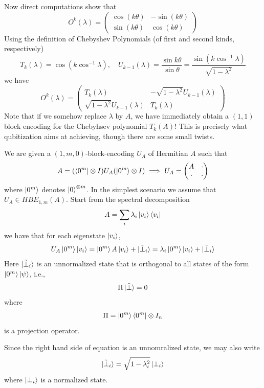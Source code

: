\documentclass[12pt, oneside]{book}
\theoremstyle{definition}
\theoremstyle{definition}
\theoremstyle{remark}
\begin{document}
Now direct computations show that
\[
O^k(\lambda)=\begin{pmatrix} \cos (k\theta) & -\sin (k \theta) \\ \sin (k\theta) & \cos (k\theta) \end{pmatrix}
\]
Using the definition of Chebyshev Polynomials (of first and second kinds, respectively)
\[
T_k(\lambda)=\cos{(k \cos^{-1}\lambda)}, \quad  U_{k-1}(\lambda) =\frac{\sin{k\theta}}{\sin{\theta}} =\frac{\sin(k\cos^{-1}\lambda)}{\sqrt{1-\lambda^2}}
\]
we have
\[
O^k(\lambda) = \begin{pmatrix} T_k(\lambda) & - \sqrt{1-\lambda^2}U_{k-1}(\lambda)\\
\sqrt{1-\lambda^2} U_{k-1}(\lambda) & T_k(\lambda) \end{pmatrix}
\]
Note that if we somehow replace $\lambda$ by $A$, we have immediately obtain a $(1,1)$ block encoding for the Chebyhsev polynomial $T_k(A)$! This is precisely what qubitization aims at achieving, though there are some small twists.

We are given a $(1,m,0)$-block-encoding $U_A$ of Hermitian $A$ such that
\[
A=(\bra{0^m}\otimes I)U_A(\ket{0^m}\otimes I)\implies U_A=\begin{pmatrix} A & \cdot \\ 
\cdot & \cdot \end{pmatrix}
\]
where $\ket{0^m}$ denotes $\ket{0}^{\otimes m}$. In the simplest scenario we assume that $U_A \in HBE_{1,m} (A)$. Start from the spectral decomposition
\[
A=\sum_i \lambda_i \ket{v_i}\bra{v_i}
\]
we have that for each eigenstate $\ket{v_i}$,
\[
U_A\ket{0^m}\ket{v_i}=\ket{0^m}A\ket{v_i}+\ket{\tilde{\perp}_i} = \lambda_i \ket{0^m}\ket{v_i}+\ket{\tilde{\perp}_i}
\]
Here $\ket{\tilde{\perp}_i}$ is an unnormalized state that is orthogonal to all states of the form $\ket{0^m}\ket{\psi}$, i.e.,
\[
\Pi \ket{\tilde{\perp}}=0
\]
where
\[
\Pi = \ket{0^m}\bra{0^m} \otimes I_n
\]
is a projection operator.

Since the right hand side of equation is an unnomralized state, we may also write
\[
\ket{\tilde{\perp}_i} = \sqrt{1-\lambda_i^2}\ket{\perp_i}
\]
where $\ket{\perp_i}$ is a normalized state.
\end{document}
